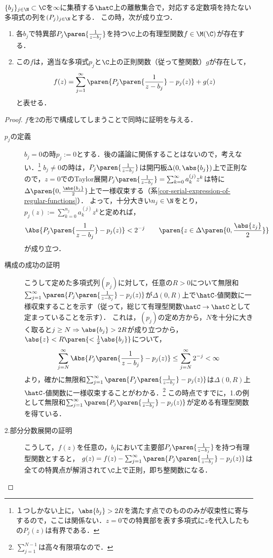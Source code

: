 \documentclass[uplatex, dvipdfmx]{jsreport}
\begin{document}
\begin{theorem}[有理型関数の部分分数展開の存在]\label{thm-partial-fraction-decomposition}
    $\{b_j\}_{j\in\N}\subset\C$を$\infty$に集積する$\hatC$上の離散集合で，対応する定数項を持たない多項式の列を$(P_j)_{j\in\N}$とする．
    この時，次が成り立つ．
    \begin{enumerate}
        \item 各$b_j$で特異部$P_j\paren{\frac{1}{z-b_j}}$を持つ$\C$上の有理型関数$f\in\M(\C)$が存在する．
        \item この$f$は，適当な多項式$p_j$と$\C$上の正則関数（従って整関数）$g$が存在して，\[f(z)=\sum^\infty_{j=1}\paren{P_j\paren{\frac{1}{z-b_j}}-p_j(z)}+g(z)\]
        と表せる．
    \end{enumerate}
\end{theorem}
\begin{proof}
    $f$を2の形で構成してしまうことで同時に証明を与える．
    \begin{description}
        \item[$p_j$の定義] 
        $b_j=0$の時$p_j:=0$とする．後の議論に関係することはないので，考えない．\footnote{１つしかない上に，$\abs{b_j}>2R$を満たす点でのもののみが収束性に寄与するので，ここは関係ない．$z=0$での特異部を表す多項式に$z$を代入したもの$P_j(z)$は有界である．}
        $b_j\ne 0$の時は，$P_j\paren{\frac{1}{z-b_j}}$は開円板$\Delta(0,\abs{b_j})$上で正則なので，$z=0$でのTaylor展開$P_j\paren{\frac{1}{z-b_j}}=\sum^\infty_{k=0}a_k^{(j)}z^k$は特に$\Delta\paren{0,\frac{\abs{b_j}}{2}}$上で一様収束する（系\ref{cor-serial-expression-of-regular-functions}）．
        よって，十分大きい$n_j\in\N$をとり，$p_j(z):=\sum^{n_j}_{k=0}a_k^{(j)}z^k$と定めれば，
        \[\Abs{P_j\paren{\frac{1}{z-b_j}}-p_j(z)}<2^{-j}\qquad\paren{z\in\Delta\paren{0,\frac{\abs{z_j}}{2}}}\]
        が成り立つ．
        \item[構成の成功の証明]
        こうして定めた多項式列$(p_j)$に対して，任意の$R>0$について無限和$\sum^\infty_{j=1}\paren{P_j\paren{\frac{1}{z-b_j}}-p_j(z)}$が$\Delta(0,R)$上で$\hatC$-値関数に一様収束することを示す（従って，総じて有理型関数$\hatC\to\hatC$として定まっていることを示す）．
        これは，$(p_j)$の定め方から，$N$を十分に大きく取ると$j\ge N\Rightarrow\abs{b_j}>2R$が成り立つから，$\abs{z}<R\paren{<\frac{1}{2}\abs{b_j}}$について，
        \begin{align*}
            \sum^\infty_{j=N}\Abs{P_j\paren{\frac{1}{z-b_j}}-p_j(z)}\le\sum^\infty_{j=N}2^{-j}<\infty
        \end{align*}
        より，確かに無限和$\sum^\infty_{j=1}\paren{P_j\paren{\frac{1}{z-b_j}}-p_j(z)}$は$\Delta(0,R)$上$\hatC$-値関数に一様収束することがわかる．\footnote{$\sum^{N-1}_{j=1}$は高々有限項なので．}
        この時点ですでに，1.の例として無限和$\sum^\infty_{j=1}\paren{P_j\paren{\frac{1}{z-b_j}}-p_j(z)}$が定める有理型関数を得ている．
        \item[2.部分分数展開の証明]
        こうして，$f(z)$を任意の，$b_j$において主要部$P_j\paren{\frac{1}{z-b_j}}$を持つ有理型関数とすると，
        $g(z)=f(z)-\sum^\infty_{j=1}\paren{P_j\paren{\frac{1}{z-b_j}}-p_j(z)}$は全ての特異点が解消されて$\C$上で正則，即ち整関数になる．
    \end{description}
\end{proof}
\end{document}
